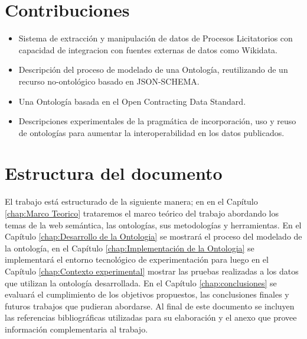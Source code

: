 \section{Contribuciones}
\label{Contribuciones}
\begin{itemize}
\item Sistema de extracción y manipulación de datos de Procesos Licitatorios con capacidad de integracion con fuentes externas de datos como Wikidata.
\item Descripción del proceso de modelado de una Ontología, reutilizando de un recurso no-ontológico basado en JSON-SCHEMA.
\item Una Ontología basada en el Open Contracting Data Standard.
\item Descripciones experimentales de la pragmática de incorporación, uso y reuso de ontologías para aumentar la interoperabilidad en los datos publicados.

\end{itemize}
 

\section{Estructura del documento}
El trabajo está estructurado de la siguiente manera; en  en el  Capítulo \ref{chap:Marco Teorico}  trataremos el marco teórico del trabajo abordando los temas de la web semántica, las ontologías, sus metodologías y herramientas. En el Capítulo \ref{chap:Desarrollo de la Ontologia} se mostrará el proceso del modelado de la ontología, en el Capítulo \ref{chap:Implementación de la Ontologia} se implementará el entorno tecnológico de experimentación para luego en el Capítulo  \ref{chap:Contexto experimental} mostrar las pruebas realizadas a los datos que utilizan la ontología desarrollada. En el Capítulo \ref{chap:conclusiones} se evaluará el cumplimiento de los objetivos propuestos, las conclusiones finales y futuros trabajos que pudieran abordarse. Al final de este documento  se  incluyen las referencias bibliográficas utilizadas para su elaboración y el anexo que provee información complementaria al trabajo.


